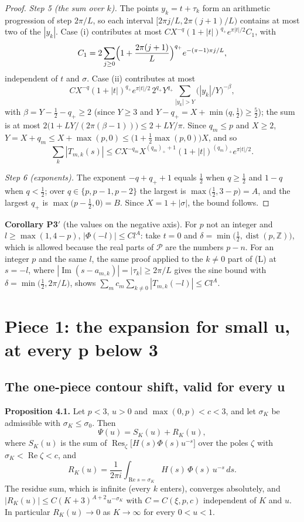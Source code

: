 \documentclass[11pt]{article}
\newcommand{\re}{\operatorname{Re}}
\newcommand{\im}{\operatorname{Im}}
\newcommand{\Res}{\operatorname{Res}}
\newcommand{\dist}{\operatorname{dist}}
\begin{document}
\begin{proof}
\emph{Step 5 (the sum over $k$).} The points $y_k=t+\tau_k$ form an arithmetic progression of step $2\pi/L$, so each interval $[2\pi j/L,2\pi(j+1)/L)$ contains at most two of the $|y_k|$. Case (i) contributes at most $CX^{-q}(1+|t|)^{q_+}e^{\pi|t|/2}C_1$, with
\[
C_1=2\sum_{j\ge0}\Bigl(1+\frac{2\pi(j+1)}{L}\Bigr)^{q_+}e^{-(\pi-1)\pi j/L},
\]
independent of $t$ and $\sigma$. Case (ii) contributes at most
\[
CX^{-q}(1+|t|)^{q_+}e^{\pi|t|/2}\,2^{q_+}Y^{q_+}\sum_{|y_k|>Y}\bigl(|y_k|/Y\bigr)^{-\beta},
\]
with $\beta=Y-\frac12-q_+\ge2$ (since $Y\ge3$ and $Y-q_+=X+\min\bigl(q,\frac12\bigr)\ge\frac52$); the sum is at most $2\bigl(1+LY/(2\pi(\beta-1))\bigr)\le2+LY/\pi$. Since $q_m\le p$ and $X\ge2$, $Y=X+q_m\le X+\max(p,0)\le\bigl(1+\tfrac12\max(p,0)\bigr)X$, and so
\[
\sum_k|T_{m,k}(s)|\le C X^{-q_m}X^{(q_m)_++1}(1+|t|)^{(q_m)_+}e^{\pi|t|/2}.
\]

\emph{Step 6 (exponents).} The exponent $-q+q_++1$ equals $\frac12$ when $q\ge\frac12$ and $1-q$ when $q<\frac12$; over $q\in\{p,p-1,p-2\}$ the largest is $\max\bigl(\frac12,3-p\bigr)=A$, and the largest $q_+$ is $\max\bigl(p-\frac12,0\bigr)=B$. Since $X=1+|\sigma|$, the bound follows.
\end{proof}

\noindent\textbf{Corollary P3$'$} (the values on the negative axis). For $p$ not an integer and $l\ge\max(1,4-p)$, $|\Phi(-l)|\le Cl^A$: take $t=0$ and $\delta=\min\bigl(\frac12,\dist(p,\mathbb{Z})\bigr)$, which is allowed because the real parts of $\mathcal{P}$ are the numbers $p-n$. For an integer $p$ and the same $l$, the same proof applied to the $k\ne0$ part of (L) at $s=-l$, where $|\im(s-a_{m,k})|=|\tau_k|\ge2\pi/L$ gives the sine bound with $\delta=\min\bigl(\frac12,2\pi/L\bigr)$, shows $\sum_mc_m\sum_{k\ne0}|T_{m,k}(-l)|\le Cl^A$.

\section{Piece 1: the expansion for small u, at every p below 3}\label{sec:P1}

\subsection{The one-piece contour shift, valid for every u}

\noindent\textbf{Proposition 4.1.} Let $p<3$, $u>0$ and $\max(0,p)<c<3$, and let $\sigma_K$ be admissible with $\sigma_K\le\sigma_0$. Then
\[
\Psi(u)=S_K(u)+R_K(u),
\]
where $S_K(u)$ is the sum of $\Res_\zeta\bigl[H(s)\Phi(s)u^{-s}\bigr]$ over the poles $\zeta$ with $\sigma_K<\re\zeta<c$, and
\[
R_K(u)=\frac{1}{2\pi i}\int_{\re s=\sigma_K}H(s)\,\Phi(s)\,u^{-s}\,ds.
\]
The residue sum, which is infinite (every $k$ enters), converges absolutely, and $|R_K(u)|\le C(K+3)^{A+2}u^{-\sigma_K}$ with $C=C(\xi,p,c)$ independent of $K$ and $u$. In particular $R_K(u)\to0$ as $K\to\infty$ for every $0<u<1$.
\end{document}
